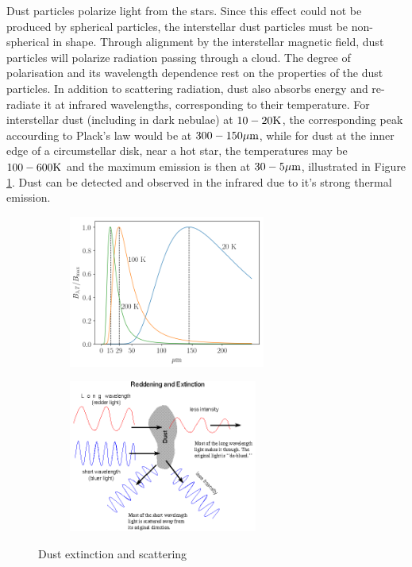 Dust particles polarize light from the stars. Since this effect could not be produced by spherical particles, the interstellar dust particles must be non-spherical in shape. Through alignment by the interstellar magnetic field, dust particles will polarize radiation passing through a cloud. The degree of polarisation and its wavelength dependence rest on the properties of the dust particles. In addition to scattering radiation, dust also absorbs energy and re-radiate it at infrared wavelengths, corresponding to their temperature. For interstellar dust (including in dark nebulae) at $10 - 20 \rm{K}$, the corresponding peak accourding to Plack's law would be at $300 - 150 \rm{\mu m}$, while for dust at the inner edge of a circumstellar disk, near a hot star, the temperatures may be $100 - 600 \rm{K}$ and the maximum emission is then at $30 - 5 \rm{\mu m}$, illustrated in Figure \ref{fig:dust-planck}. Dust can be detected and observed in the infrared due to it's strong thermal emission. 
	
\begin{figure}[ht]
	\begin{subfigure}[t]{0.45\textwidth}
		\includegraphics[height=5cm]{img/planck}
		\subcaption{}
		\label{fig:dust-planck}
	\end{subfigure}\hfill%
	\begin{subfigure}[t]{0.45\textwidth}
		\includegraphics[height=5cm]{img/dust2}
		\subcaption{}
		\label{fig:dust2}
	\end{subfigure}%
\caption{Dust extinction and scattering}
\label{fig:barnard68}
\end{figure}

